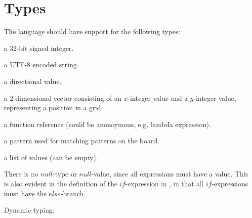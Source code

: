 \section{Types}
\label{sec:types}

The language should have support for the following types:

\begin{description}[noitemsep]
\item[Integer] a 32-bit signed integer.
\item[String] a UTF-8 encoded string.
\item[Direction] a directional value.
\item[Coordinate] a 2-dimensional vector consisting of an $x$-integer value and
a $y$-integer value, representing a position in a grid.
\item[Function] a function reference (could be anonoymous, e.g. lambda expression).
\item[Pattern] a pattern used for matching patterns on the board.
\item[List] a list of values (can be empty).
\item[Action]
\end{description}

There is no $null$-type or $null$-value, since all expressions must have a value. This
is also evident in the definition of the $if$-expression in , in that
all $if$-expressions must have the $else$-branch.

Dynamic typing.


